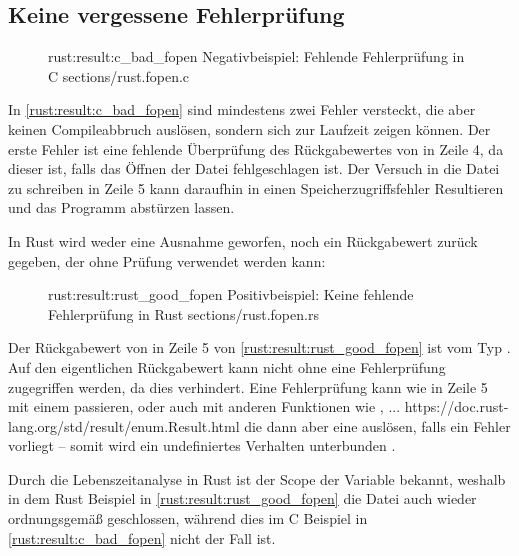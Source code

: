 \subsection{Keine vergessene Fehlerprüfung}
\label{rust:result}

\begin{figure}[H]
	\ccinclude
	{rust:result:c_bad_fopen}
	{Negativbeispiel: Fehlende Fehlerprüfung in C}
	{sections/rust.fopen.c}
\end{figure}

In \autoref{rust:result:c_bad_fopen} sind mindestens zwei Fehler versteckt, die aber keinen Compileabbruch auslösen, sondern sich zur Laufzeit zeigen können.
Der erste Fehler ist eine fehlende Überprüfung des Rückgabewertes von  in Zeile 4, da dieser  ist, falls das Öffnen der Datei fehlgeschlagen ist.
Der Versuch in die Datei zu schreiben in Zeile 5 kann daraufhin in einen Speicherzugriffsfehler Resultieren und das Programm abstürzen lassen.

In Rust wird weder eine Ausnahme geworfen, noch ein Rückgabewert zurück gegeben, der ohne Prüfung verwendet werden kann:

\begin{figure}[H]
	\rustcinclude
		{rust:result:rust_good_fopen}
		{Positivbeispiel: Keine fehlende Fehlerprüfung in Rust}
		{sections/rust.fopen.rs}
\end{figure}

Der Rückgabewert von  in Zeile 5 von \autoref{rust:result:rust_good_fopen} ist vom Typ .
Auf den eigentlichen Rückgabewert  kann nicht ohne eine Fehlerprüfung zugegriffen werden, da dies  verhindert.
Eine Fehlerprüfung kann wie in Zeile 5 mit einem  passieren, oder auch mit anderen Funktionen wie ,  ... https://doc.rust-lang.org/std/result/enum.Result.html die dann aber eine   auslösen, falls ein Fehler vorliegt -- somit wird ein undefiniertes Verhalten unterbunden .

Durch die Lebenszeitanalyse  in Rust ist der Scope der  Variable bekannt, weshalb in dem Rust Beispiel in \autoref{rust:result:rust_good_fopen} die Datei auch wieder ordnungsgemäß geschlossen, während dies im C Beispiel in \autoref{rust:result:c_bad_fopen} nicht der Fall ist.

